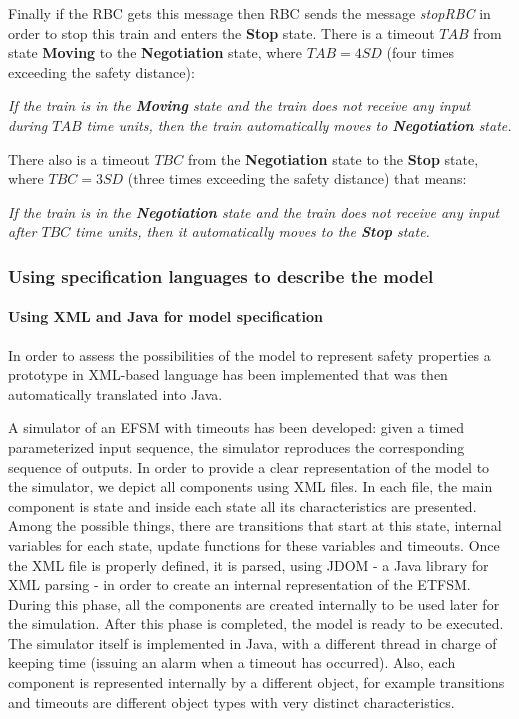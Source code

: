 \documentclass{template/openetcs_article}
\begin{document}
Finally if the RBC gets this message then RBC sends the message \textit{stopRBC} in order to stop this train and enters the \textbf{Stop} state. There is a timeout $TAB$ from state \textbf{Moving} to the \textbf{Negotiation} state, where $TAB = 4 SD$ (four times exceeding the safety distance): 

\textit{If the train is in the \textbf{Moving} state and the train does not receive any input during $TAB$ time units, then the train automatically moves to \textbf{Negotiation} state.}

There also is a timeout $TBC$ from the \textbf{Negotiation} state to the \textbf{Stop} state, where $TBC = 3 SD$ (three times exceeding the safety distance) that means:

\textit{If the train is in the \textbf{Negotiation} state and the train does not receive any input after $TBC$ time units, then it automatically moves to the \textbf{Stop} state.}

\subsubsection{Using specification languages to describe the model}

\paragraph{Using XML and Java for model specification}

In order to assess the possibilities of the model to represent safety properties a prototype in XML-based language has been implemented that was then automatically translated into Java.

A simulator of an EFSM with timeouts has been developed: given a timed parameterized input sequence,  the simulator reproduces the corresponding sequence of outputs. In order to provide a clear representation of the model to the simulator, we depict all components using XML files. In each file, the main component is state and inside each state all its characteristics are presented. Among the possible things, there are transitions that start at this state, internal variables for each state, update functions for these variables and timeouts.  Once the XML file is properly defined, it is parsed, using JDOM - a Java library for XML parsing -  in order to create an internal representation of the ETFSM. During this phase, all the components are created internally to be used later for the simulation. After this phase is completed, the model is ready to be executed. The simulator itself is implemented in Java, with a different thread in charge of keeping time (issuing an alarm when a timeout has occurred). Also, each component is represented internally by a different object, for example transitions and timeouts are different object types with very distinct characteristics. 
\end{document}
